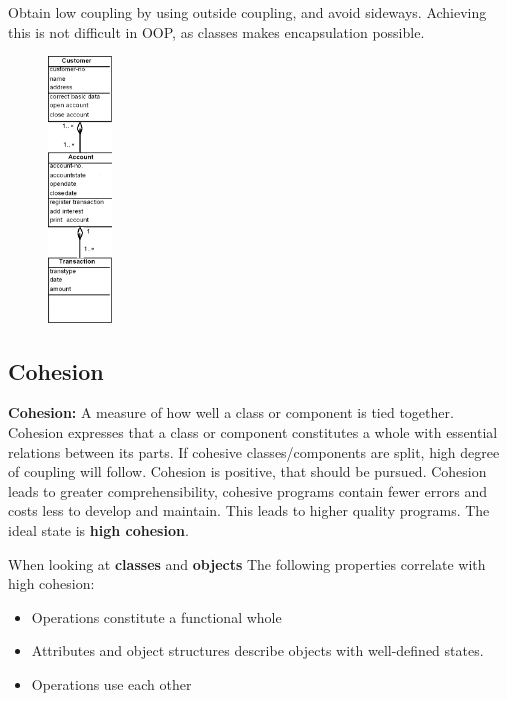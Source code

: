 Obtain low coupling by using outside coupling, and avoid sideways. Achieving this is not difficult in OOP, as classes makes encapsulation possible.

\begin{figure}[H]
    \centering
   \includegraphics[width=0.15\textwidth]{figures/cohesion.png}
\end{figure}

\subsection{Cohesion}
\textbf{Cohesion:} A measure of how well a class or component is tied together. \\
Cohesion expresses that a class or component constitutes a whole with essential relations between its parts. If cohesive classes/components are split, high degree of coupling will follow. Cohesion is positive, that should be pursued. Cohesion leads to greater comprehensibility, cohesive programs contain fewer errors and costs less to develop and maintain. This leads to higher quality programs.
The ideal state is \textbf{high cohesion}. 

When looking at \textbf{classes} and \textbf{objects} The following properties correlate with high cohesion:
\begin{itemize}
    \item Operations constitute a functional whole
    \item Attributes and object structures describe objects with well-defined states. 
    \item Operations use each other
\end{itemize}

